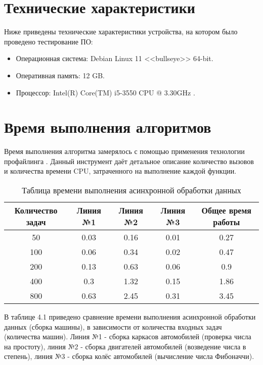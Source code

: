 \documentclass[12pt]{report}
\begin{document}
\section{Технические характеристики}

Ниже приведены технические характеристики устройства, на котором было проведено тестирование ПО:

\begin{itemize}
	\item Операционная система: Debian \cite{debian} Linux \cite{linux} 11 <<bullseye>> 64-bit.
	\item Оперативная память: 12 GB.
	\item Процессор: Intel(R) Core(TM) i5-3550 CPU @ 3.30GHz
\cite{i5}.

\end{itemize}

\section{Время выполнения алгоритмов}

Время выполнения алгоритма замерялось с помощью применения технологии профайлинга \cite{profiling}. Данный инструмент даёт детальное описание количество вызовов и количества времени CPU, затраченного на выполнение каждой функции.

\begin{table} [h!]
	\caption{Таблица времени выполнения асинхронной обработки данных}
	\begin{center}
		\begin{tabular}{|c c c c c|} 
		 	\hline
			Количество задач & Линия №1 & Линия №2 & Линия №3 & Общее время работы  \\  
		 	\hline
		 	50 & 0.03 & 0.16 & 0.01 & 0.27 \\
		 	\hline
		 	100 & 0.06 & 0.34 & 0.02 & 0.47 \\
		 	\hline
		 	200 & 0.13 & 0.63 & 0.06 & 0.9 \\
		 	\hline
			400 & 0.3 & 1.32 & 0.15 & 1.86 \\
			\hline
			800 & 0.63  & 2.45 & 0.31 & 3.45 \\
			\hline
		\end{tabular}
	\end{center}
\end{table}

В таблице 4.1 приведено сравнение времени выполнения асинхронной обработки данных (сборка машины), в зависимости от количества входных задач (количества машин). Линия №1 - сборка каркасов автомобилей (проверка числа на простоту), линия №2 - сборка двигателей автомобилей (возведение числа в степень), линия №3 - сборка колёс автомобилей (вычисление числа Фибоначчи).
\end{document}

